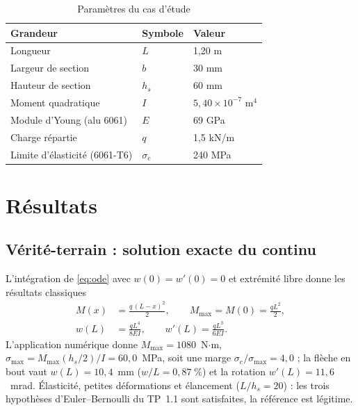 \documentclass[10pt,journal]{IEEEtran}
\begin{document}
\begin{table}[!t]
\caption{Paramètres du cas d'étude}
\label{tab:param}
\centering
\begin{tabular}{@{}lll@{}}
\toprule
Grandeur & Symbole & Valeur \\
\midrule
Longueur & $L$ & 1,20 m \\
Largeur de section & $b$ & 30 mm \\
Hauteur de section & $h_s$ & 60 mm \\
Moment quadratique & $I$ & $5{,}40\times10^{-7}$ m$^4$ \\
Module d'Young (alu 6061) & $E$ & 69 GPa \\
Charge répartie & $q$ & 1,5 kN/m \\
Limite d'élasticité (6061-T6) & $\sigma_e$ & 240 MPa \\
\bottomrule
\end{tabular}
\end{table}

\section{Résultats}
\subsection{Vérité-terrain : solution exacte du continu}
L'intégration de \eqref{eq:ode} avec $w(0)=w'(0)=0$ et extrémité libre donne les résultats classiques~\cite{gere}
\begin{align}
M(x) &= \frac{q\,(L-x)^2}{2}, \qquad M_{\max}=M(0)=\frac{qL^2}{2},\\
w(L) &= \frac{qL^4}{8EI}, \qquad w'(L) = \frac{qL^3}{6EI}.
\end{align}
L'application numérique donne $M_{\max}=1080$~N$\cdot$m, $\sigma_{\max}=M_{\max}(h_s/2)/I=60{,}0$~MPa, soit une marge $\sigma_e/\sigma_{\max}=4{,}0$ ; la flèche en bout vaut $w(L)=10{,}4$~mm ($w/L=0{,}87\;\%$) et la rotation $w'(L)=11{,}6$~mrad. Élasticité, petites déformations et élancement ($L/h_s=20$) : les trois hypothèses d'Euler--Bernoulli du TP~1.1 sont satisfaites, la référence est légitime.
\end{document}
